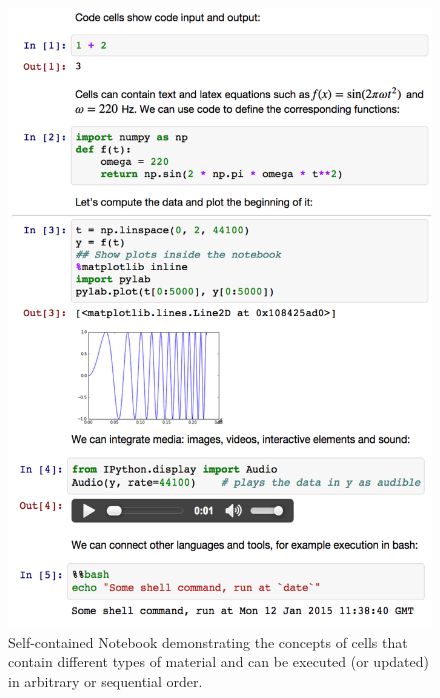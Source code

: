 \label{sec:jupyter}

\begin{figure}
\includegraphics[scale=0.4]{Pictures/jupyterdemo-largefont.pdf}
\caption{\label{fig:jupyterdemo} Self-contained \Jupyter Notebook demonstrating the concepts of cells that contain different types of material and can be executed (or updated) in arbitrary or sequential order.}
\end{figure}

